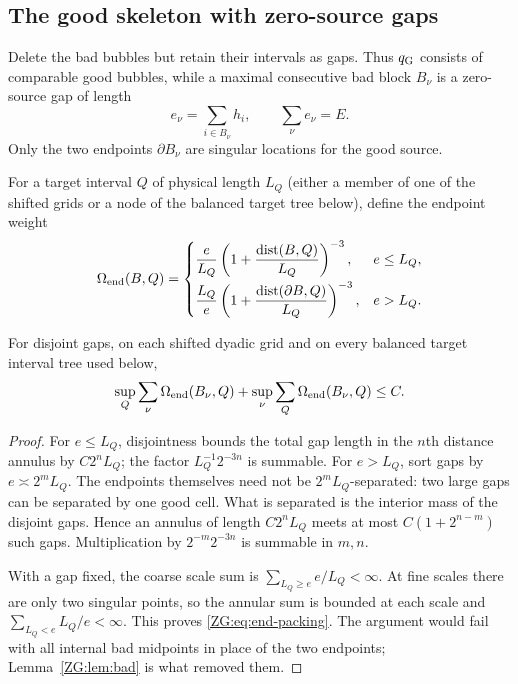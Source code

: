 \subsection{The good skeleton with zero-source gaps}

Delete the bad bubbles but retain their intervals as gaps.  Thus
$q_{\rm G}$ consists of comparable good bubbles, while a maximal
consecutive bad block $B_\nu$ is a zero-source gap of length
\begin{equation}\label{ZG:eq:gaps}
 e_\nu=\sum_{i\in B_\nu}h_i,
 \qquad \sum_\nu e_\nu=E.
\end{equation}
Only the two endpoints $\partial B_\nu$ are singular locations for the
good source.

For a target interval $Q$ of physical length $L_Q$ (either a member of
one of the shifted grids or a node of the balanced target tree below),
define the endpoint weight
\begin{equation}\label{ZG:eq:Omega-end}
 \Omega_{\rm end}(B,Q)=
 \begin{cases}
 \displaystyle \frac e{L_Q}
 \left(1+\frac{\operatorname {dist}(B,Q)}{L_Q}\right)^{-3},
 &e\le L_Q,\\[3mm]
 \displaystyle \frac {L_Q}e
 \left(1+\frac{\operatorname {dist}(\partial B,Q)}{L_Q}\right)^{-3},
 &e>L_Q.
 \end{cases}
\end{equation}

\begin{lemma}\label{ZG:lem:end-packing}
For disjoint gaps, on each shifted dyadic grid and on every balanced
target interval tree used below,
\begin{equation}\label{ZG:eq:end-packing}
 \sup_Q\sum_\nu\Omega_{\rm end}(B_\nu,Q)
 +\sup_\nu\sum_Q\Omega_{\rm end}(B_\nu,Q)\le C.
\end{equation}
\end{lemma}

\begin{proof}
For $e\le L_Q$, disjointness bounds the total gap length in the $n$th
distance annulus by $C2^nL_Q$; the factor
$L_Q^{-1}2^{-3n}$ is summable.  For $e>L_Q$, sort gaps by
$e\asymp2^mL_Q$.  The endpoints themselves need not be
$2^mL_Q$-separated: two large gaps can be separated by one good cell.
What is separated is the interior mass of the disjoint gaps.  Hence an
annulus of length $C2^nL_Q$ meets at most
$C(1+2^{n-m})$ such gaps.  Multiplication by
$2^{-m}2^{-3n}$ is summable in $m,n$.

With a gap fixed, the coarse scale sum is
$\sum_{L_Q\ge e}e/L_Q<\infty$.  At fine scales there are only two
singular points, so the annular sum is bounded at each scale and
$\sum_{L_Q<e}L_Q/e<\infty$.  This proves \eqref{ZG:eq:end-packing}.  The
argument would fail with all internal bad midpoints in place of the two
endpoints; Lemma~\ref{ZG:lem:bad} is what removed them.
\end{proof}

